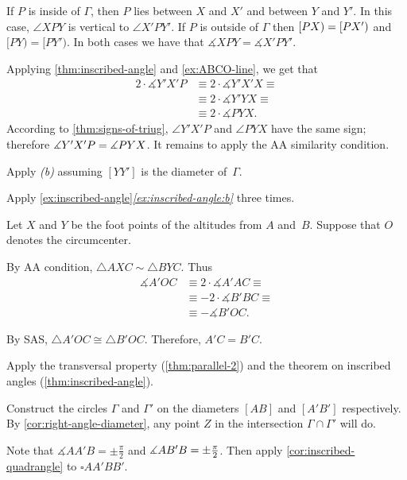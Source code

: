 \begin{multicols}{2}
 If $P$ is inside of $\Gamma$, then $P$ lies between $X$ and $X'$ and between $Y$ and $Y'$.
In this case, $\angle XPY$ is vertical to $\angle X'PY'$.
If $P$ is outside of $\Gamma$ then $[PX)\z=[PX')$ and $[PY)=[PY')$.
In both cases we have that $\measuredangle XPY=\measuredangle X'PY'$.

Applying \ref{thm:inscribed-angle} and \ref{ex:ABCO-line}, we get that
\begin{align*}
2\cdot \measuredangle Y'X'P
&\equiv
2\cdot \measuredangle Y'X'X\equiv 
\\
&\equiv
2\cdot\measuredangle Y'YX\equiv
\\
&\equiv
2\cdot\measuredangle PYX.
\end{align*}
According to \ref{thm:signs-of-triug}, $\angle Y'X'P$ and $\angle PYX$ have the same sign;
therefore
$\measuredangle Y'X'P\z= \measuredangle PYX$.
It remains to apply the AA similarity condition.

 Apply \textit{(b)} assuming $[YY']$ is the diameter of~$\Gamma$. 

 Apply \ref{ex:inscribed-angle}\textit{\ref{ex:inscribed-angle:b}}
three times.

Let $X$ and $Y$ be the foot points of the altitudes from $A$ and~$B$.
Suppose that $O$ denotes the circumcenter.
 
By AA condition, $\triangle A X C\sim \triangle B Y C$.
Thus 
\begin{align*}
\measuredangle A'OC
&\equiv 
2\cdot \measuredangle A' A C
\equiv
\\
&\equiv-2\cdot\measuredangle B' B C
\equiv
\\
&\equiv-\measuredangle B'OC.
\end{align*}

By SAS, $\triangle A'OC\cong\triangle B'OC$.
Therefore, $A'C=B'C$.

 Apply the transversal property (\ref{thm:parallel-2}) and the theorem on inscribed angles (\ref{thm:inscribed-angle}).

Construct the circles $\Gamma$ and $\Gamma'$
on the diameters $[AB]$ and $[A'B']$ respectively.
By \ref{cor:right-angle-diameter},
any point $Z$ in the intersection $\Gamma\cap \Gamma'$ will do.


Note that $\measuredangle AA'B=\pm\tfrac\pi2$ and $\measuredangle AB'B\z=\pm\tfrac\pi2$.
Then apply \ref{cor:inscribed-quadrangle}
to $\square AA'BB'$.


\end{multicols}
